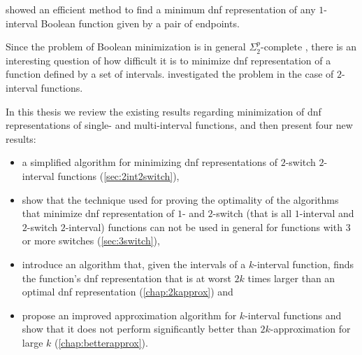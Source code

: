 \citeauthor{Schieber2005154} showed an efficient method
to find a minimum \acrfull{dnf} representation
of any $1$-interval Boolean function
given by a pair of endpoints.\citep{Schieber2005154}

Since the problem of Boolean minimization is in general
$\Sigma_2^p$-complete \citep{Umans1998},
there is an interesting question of how difficult it is
to minimize \acrshort{dnf} representation of
a function defined by a set of intervals.
\citeauthor{Dubovsky2012} investigated the problem
in the case of $2$-interval functions.\citep{Dubovsky2012}

In this thesis we review the existing results regarding
minimization of \acrshort{dnf} representations of
single- and multi-interval functions,
and then present four new results:

\begin{itemize}
\item a simplified algorithm
for minimizing \acrshort{dnf} representations
of $2$-switch
$2$-interval functions (\cref{sec:2int2switch}),
\item
show that the technique used for proving the optimality
of the algorithms that minimize
\acrshort{dnf} representation
of $1$- and $2$-switch
(that is all $1$-interval
and $2$-switch $2$-interval)
functions
can not be used in general for
functions with $3$ or more switches
(\cref{sec:3switch}),
\item
introduce an algorithm
that,
given the intervals of a $k$-interval function,
finds the function's \acrshort{dnf} representation
that is at worst
$2k$ times larger
than an optimal \acrshort{dnf} representation
(\cref{chap:2kapprox}) and
\item
propose an improved approximation algorithm
for $k$-interval functions
and show that it does not perform significantly
better than $2k$-approximation for large $k$
(\cref{chap:betterapprox}).
\end{itemize}
